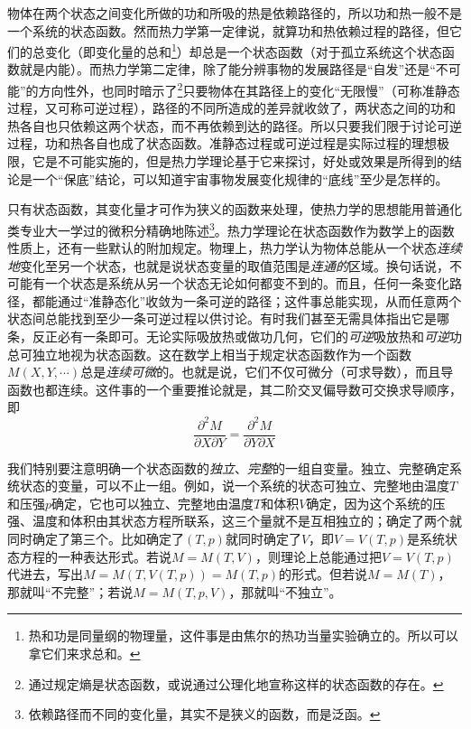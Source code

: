 \documentclass[main.tex]{subfiles}
\begin{document}
物体在两个状态之间变化所做的功和所吸的热是依赖路径的，所以功和热一般不是一个系统的状态函数。然而热力学第一定律说，就算功和热依赖过程的路径，但它们的总变化（即变化量的总和\footnote{热和功是同量纲的物理量，这件事是由焦尔的热功当量实验确立的。所以可以拿它们来求总和。}）却总是一个状态函数（对于孤立系统这个状态函数就是内能）。而热力学第二定律，除了能分辨事物的发展路径是“自发”还是“不可能”的方向性外，也同时暗示了\footnote{通过规定熵是状态函数，或说通过公理化地宣称这样的状态函数的存在。}只要物体在其路径上的变化“无限慢”（可称准静态过程，又可称可逆过程），路径的不同所造成的差异就收敛了，两状态之间的功和热各自也只依赖这两个状态，而不再依赖到达的路径。所以只要我们限于讨论可逆过程，功和热各自也成了状态函数。准静态过程或可逆过程是实际过程的理想极限，它是不可能实施的，但是热力学理论基于它来探讨，好处或效果是所得到的结论是一个“保底”结论，可以知道宇宙事物发展变化规律的“底线”至少是怎样的。

只有状态函数，其变化量才可作为狭义的函数来处理，使热力学的思想能用普通化类专业大一学过的微积分精确地陈述\footnote{依赖路径而不同的变化量，其实不是狭义的函数，而是泛函。}。热力学理论在状态函数作为数学上的函数性质上，还有一些默认的附加规定。物理上，热力学认为物体总能从一个状态\emph{连续地}变化至另一个状态，也就是说状态变量的取值范围是\emph{连通的}区域。换句话说，不可能有一个状态是系统从另一个状态无论如何都变不到的。而且，任何一条变化路径，都能通过“准静态化”收敛为一条可逆的路径；这件事总能实现，从而任意两个状态间总能找到至少一条可逆过程以供讨论。有时我们甚至无需具体指出它是哪条，反正必有一条即可。无论实际吸放热或做功几何，它们的\emph{可逆}吸放热和\emph{可逆}功总可独立地视为状态函数。这在数学上相当于规定状态函数作为一个函数$M\left(X,Y,\cdots\right)$总是\emph{连续可微}的。也就是说，它们不仅可微分（可求导数），而且导函数也都连续。这件事的一个重要推论就是，其二阶交叉偏导数可交换求导顺序，即
\[\frac{\partial^2 M}{\partial X\partial Y}=\frac{\partial ^2 M}{\partial Y\partial X}\]

我们特别要注意明确一个状态函数的\emph{独立}、\emph{完整}的一组自变量。独立、完整确定系统状态的变量，可以不止一组。例如，说一个系统的状态可独立、完整地由温度$T$和压强$p$确定，它也可以独立、完整地由温度$T$和体积$V$确定，因为这个系统的压强、温度和体积由其状态方程所联系，这三个量就不是互相独立的；确定了两个就同时确定了第三个。比如确定了$\left(T,p\right)$就同时确定了$V$，即$V=V\left(T,p\right)$是系统状态方程的一种表达形式。若说$M=M\left(T,V\right)$，则理论上总能通过把$V=V\left(T,p\right)$代进去，写出$M=M\left(T,V\left(T,p\right)\right)=M\left(T,p\right)$的形式。但若说$M=M\left(T\right)$，那就叫“不完整”；若说$M=M\left(T,p,V\right)$，那就叫“不独立”。
\end{document}
